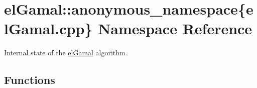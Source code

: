 \hypertarget{namespaceelGamal_1_1anonymous__namespace_02elGamal_8cpp_03}{}\section{el\+Gamal\+:\+:anonymous\+\_\+namespace\{el\+Gamal.\+cpp\} Namespace Reference}
\label{namespaceelGamal_1_1anonymous__namespace_02elGamal_8cpp_03}


Internal state of the \mbox{\hyperlink{namespaceelGamal}{el\+Gamal}} algorithm.  


\subsection*{Functions}
